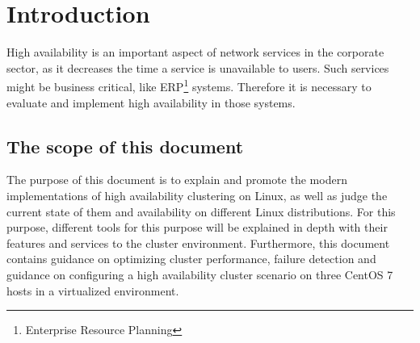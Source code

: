 \section{Introduction}

High availability is an important aspect of network services in the corporate
sector, as it decreases the time a service is unavailable to users.
Such services might be business critical, like ERP\footnote{Enterprise Resource Planning} systems.
Therefore it is necessary to evaluate and implement high availability in those systems.

\subsection{The scope of this document}
The purpose of this document is to explain and promote the modern implementations 
of high availability clustering on Linux, as well as judge the current state
of them and availability on different Linux distributions.
For this purpose, different tools for this purpose will be explained in 
depth with their features and services to the cluster environment. 
Furthermore, this document contains guidance on optimizing cluster performance, 
failure detection and guidance on configuring a high availability cluster 
scenario on three CentOS 7 hosts in a virtualized environment.
